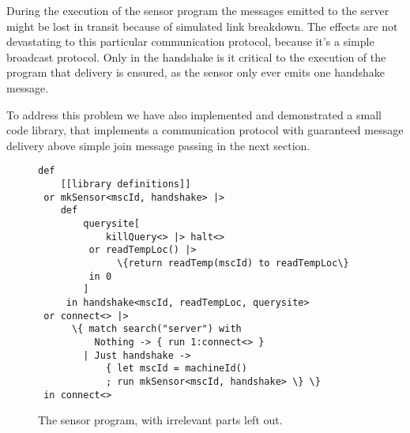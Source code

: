 During the execution of the sensor program the messages emitted to the server
might be lost in transit because of simulated link breakdown. The effects are
not devastating to this particular communication protocol, because it's a
simple broadcast protocol.  Only in the handshake is it critical to the
execution of the program that delivery is ensured, as the sensor only ever
emits one handshake message.

To address this problem we have also implemented and demonstrated a small code
library, that implements a communication protocol with guaranteed message
delivery above simple join message passing in the next section.

\begin{figure}[!h]
\begin{minipage}{0.97\textwidth}
\begin{verbatim}
def
    [[library definitions]]
 or mkSensor<mscId, handshake> |>
    def
        querysite[
            killQuery<> |> halt<>
         or readTempLoc() |>
              \{return readTemp(mscId) to readTempLoc\}
         in 0
        ]
     in handshake<mscId, readTempLoc, querysite>
 or connect<> |>
      \{ match search("server") with
          Nothing -> { run 1:connect<> }
        | Just handshake ->
            { let mscId = machineId()
            ; run mkSensor<mscId, handshake> \} \}
 in connect<>
\end{verbatim}
\end{minipage}
\caption{The sensor program, with irrelevant parts left out.}\label{fig:sensor-prog}
\end{figure}


